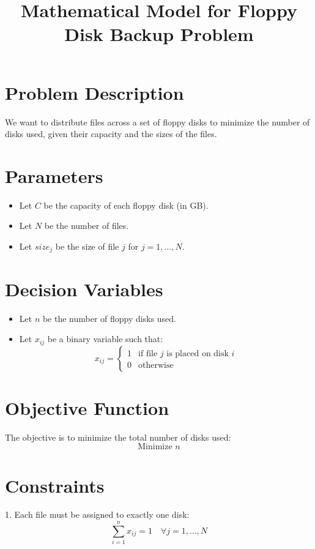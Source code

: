\documentclass{article}
\begin{document}
\title{Mathematical Model for Floppy Disk Backup Problem}
\author{}
\date{}
\maketitle

\section*{Problem Description}
We want to distribute files across a set of floppy disks to minimize the number of disks used, given their capacity and the sizes of the files.

\section*{Parameters}
\begin{itemize}
    \item Let \( C \) be the capacity of each floppy disk (in GB).
    \item Let \( N \) be the number of files.
    \item Let \( size_j \) be the size of file \( j \) for \( j = 1, \ldots, N \).
\end{itemize}

\section*{Decision Variables}
\begin{itemize}
    \item Let \( n \) be the number of floppy disks used.
    \item Let \( x_{ij} \) be a binary variable such that:
    \[
    x_{ij} = 
    \begin{cases} 
    1 & \text{if file } j \text{ is placed on disk } i \\ 
    0 & \text{otherwise} 
    \end{cases}
    \]
\end{itemize}

\section*{Objective Function}
The objective is to minimize the total number of disks used:
\[
\text{Minimize } n
\]

\section*{Constraints}
1. Each file must be assigned to exactly one disk:
\[
\sum_{i=1}^{n} x_{ij} = 1 \quad \forall j = 1, \ldots, N
\]
\end{document}
